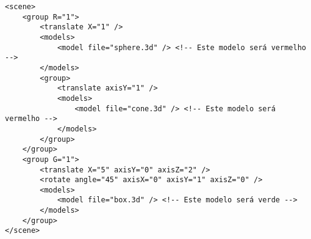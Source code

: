 \begin{verbatim}
<scene>
    <group R="1">
        <translate X="1" />
        <models>
            <model file="sphere.3d" /> <!-- Este modelo será vermelho -->
        </models>
        <group>
            <translate axisY="1" />
            <models>
                <model file="cone.3d" /> <!-- Este modelo será vermelho -->
            </models>
        </group>
    </group>
    <group G="1">
        <translate X="5" axisY="0" axisZ="2" />
        <rotate angle="45" axisX="0" axisY="1" axisZ="0" />
        <models>
            <model file="box.3d" /> <!-- Este modelo será verde -->
        </models>
    </group>
</scene>
\end{verbatim}
